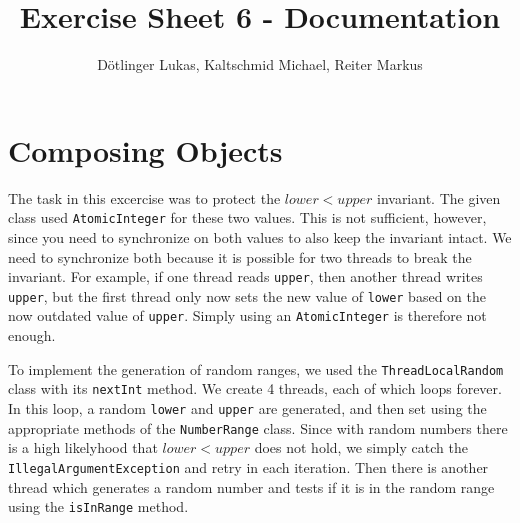 \documentclass{article}
\title{Exercise Sheet 6 - Documentation}
\date{}
\author{Dötlinger Lukas, Kaltschmid Michael, Reiter Markus}
\begin{document}
  \RaggedRight

  \maketitle

  \section{Composing Objects}
    The task in this excercise was to protect the $lower < upper$ invariant. The given class used \texttt{AtomicInteger} for these two values. This is not sufficient, however, since you need to synchronize on both values to also keep the invariant intact. We need to synchronize both because it is possible for two threads to break the invariant. For example, if one thread reads \texttt{upper}, then another thread writes \texttt{upper}, but the first thread only now sets the new value of \texttt{lower} based on the now outdated value of \texttt{upper}. Simply using an \texttt{AtomicInteger} is therefore not enough.

    To implement the generation of random ranges, we used the \texttt{ThreadLocalRandom} class with its \texttt{nextInt} method. We create 4 threads, each of which loops forever. In this loop, a random \texttt{lower} and \texttt{upper} are generated, and then set using the appropriate methods of the \texttt{NumberRange} class. Since with random numbers there is a high likelyhood that $lower < upper$ does not hold, we simply catch the \texttt{IllegalArgumentException} and retry in each iteration. Then there is another thread which generates a random number and tests if it is in the random range using the \texttt{isInRange} method.
\end{document}
